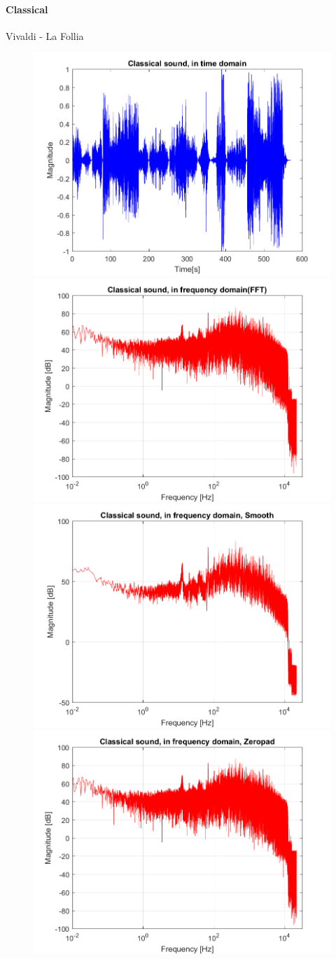 \paragraph{Classical}
Vivaldi - La Follia

\begin{figure}[htb!]
	\centering
	{\includegraphics[width=0.45\linewidth]{code/Classical_figure1.png}}
	{\includegraphics[width=0.45\linewidth]{code/Classical_figure2.png}}
	{\includegraphics[width=0.45\linewidth]{code/Classical_figure3.png}}
	{\includegraphics[width=0.45\linewidth]{code/Classical_figure4.png}}

\end{figure}
